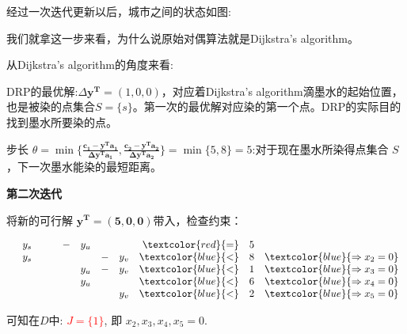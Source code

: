 经过一次迭代更新以后，城市之间的状态如图:
\begin{figure}[H]
\end{figure}

我们就拿这一步来看，为什么说原始对偶算法就是Dijkstra's algorithm。

从Dijkstra's algorithm的角度来看:

DRP的最优解:$\Delta \mathbf{y^T} = (1, 0, 0)$，对应着Dijkstra's algorithm滴墨水的起始位置，也是被染的点集合$S = \{s\}$。第一次的最优解对应染的第一个点。DRP的实际目的找到墨水所要染的点。

步长 $\theta = \min \{ \frac{ \mathbf{c_1 - y^Ta_1} }{ \mathbf{\Delta y^T a_1}  }, \frac{ \mathbf{c_2 - y^Ta_2} }{ \mathbf{\Delta y^T a_2}  }  \} = \min\{ 5, 8\} = 5$:对于现在墨水所染得点集合 $S$ ，下一次墨水能染的最短距离。


\textbf{第二次迭代}

将新的可行解 $\mathbf{ y^T = (5, 0, 0) }$带入，检查约束：
 \begin{small}
\[
\begin{array}{rrrrrrrrrrl}
 & y_s & &      &-& y_u & &     &  \textcolor{red}{=}& 5 &  \\
 & y_s & &      & &     &-& y_v &   \textcolor{blue}{<}&  8 & \textcolor{blue}{\Rightarrow  x_{2}  = 0}  \\
  &     & &      & & y_u &-& y_v &   \textcolor{blue}{<}&  1 & \textcolor{blue}{\Rightarrow  x_{3}  = 0} \\
 &     & &    &   & y_u & &     &   \textcolor{blue}{<}&  6 & \textcolor{blue}{\Rightarrow  x_{4}  = 0}  \\
 &     & &   & &     & & y_v &   \textcolor{blue}{<}&  2 & \textcolor{blue}{\Rightarrow  x_{5}  = 0}
\end{array} \nonumber
\]
\end{small}
可知在$D$中:  \textcolor{red}{$J=\{ 1\}$}, 即 $x_2,x_3,x_4,x_5=0$.

